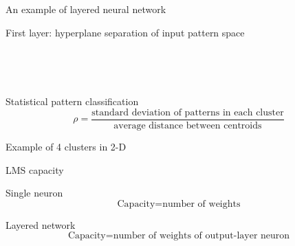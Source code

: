 \documentclass[10pt]{beamer}
\begin{document}
\begin{frame}{An example of layered neural network}
\begin{center}
	\resizebox{\textwidth}{!}{}
\end{center}
\end{frame}

\begin{frame}{First layer: hyperplane separation of input pattern space}
\begin{center}
	\begin{figure}[t!]
		\centering
		\begin{subfigure}[h!]{0.5\textwidth}
			\resizebox{0.75\linewidth}{!}{}\caption{}
		\end{subfigure}%
		~ 
		\begin{subfigure}[h!]{0.5\textwidth}
			\resizebox{0.75\linewidth}{!}{}\caption{}
		\end{subfigure}
		
		\begin{subfigure}[h!]{0.5\textwidth}
			\resizebox{0.75\linewidth}{!}{}\caption{}
		\end{subfigure}%
		~ 
		\begin{subfigure}[h!]{0.5\textwidth}
			\resizebox{0.75\linewidth}{!}{}\caption{}
		\end{subfigure}   
	\end{figure}
\end{center}
\end{frame}

\begin{frame}{Statistical pattern classification}
\begin{equation*}
	\rho = \frac{\text{standard deviation of patterns in each cluster}}{\text{average distance between centroids}} \tag{difficulty metric}
\end{equation*}
\begin{center}
	\resizebox{0.75\textwidth}{!}{}
\end{center}
Example of 4 clusters in 2-D
\end{frame}

\begin{frame}{LMS capacity}
\begin{block}{Single neuron}
	\begin{equation*}
	\text{Capacity} = \text{number of weights}
	\end{equation*}
\end{block}

\begin{block}{Layered network}
	\begin{equation*}
	\text{Capacity} = \text{number of weights of output-layer neuron}
	\end{equation*}
\end{block}

\end{frame}
\end{document}
